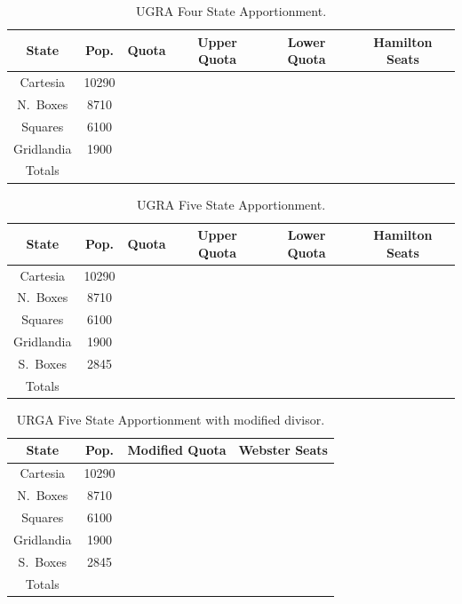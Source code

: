 	\begin{small}
		\begin{table}[!ht]
			\centering
			\renewcommand{\arraystretch}{1.5}
			\begin{tabular}{|c | c | c | c | c | c |}
				\hline
				State & Pop. & Quota & Upper Quota & Lower Quota & Hamilton Seats \\
				\hline
				Cartesia & 10290 & \phantom{Upper Quota} & & & \\
				\hline
				N.\ Boxes & 8710 & \phantom{32.26} & & & \\
				\hline
				Squares & 6100 & \phantom{22.59} & & & \\
				\hline
				Gridlandia & 1900 & \phantom{ 7.03 } & & & \\
				\hline
				Totals & & & & & \\
				\hline
			\end{tabular}
			\caption{UGRA Four State Apportionment.}
			\label{tab:four_states}
		\end{table}

		\begin{table}[!ht]
			\centering
			\renewcommand{\arraystretch}{1.5}
			\begin{tabular}{|c | c | c | c | c | c |}
				\hline
				State & Pop. & Quota & Upper Quota & Lower Quota & Hamilton Seats \\
				\hline
				Cartesia & 10290 & \phantom{Upper Quota} & & & \\
				\hline
				N.\ Boxes & 8710 & \phantom{32.26} & & & \\
				\hline
				Squares & 6100 & \phantom{22.59} & & & \\
				\hline
				Gridlandia & 1900 & \phantom{ 7.03 } & & & \\
				\hline
				S.\ Boxes & 2845 & \phantom{10.48}  & & & \\
				\hline
				Totals & & & & & \\
				\hline
			\end{tabular}
			\caption{UGRA Five State Apportionment.}
			\label{tab:five_states}
		\end{table}

		\begin{table}[!ht]
			\centering
			\renewcommand{\arraystretch}{1.5}
			\begin{tabular}{|c | c | c | c |}
				\hline
				State & Pop. & Modified Quota & Webster Seats \\
				\hline
				Cartesia & 10290 & \phantom{ 38.11 / 37.92} &\\
				\hline
				N.\ Boxes & 8710 & \phantom{32.26/32.10} & \\
				\hline
				Squares & 6100 & \phantom{22.59/22.48} &  \\
				\hline
				Gridlandia & 1900 & \phantom{ 7.03/7.00 } & \\
				\hline
				S.\ Boxes & 2845 & \phantom{10.48}  & \\
				\hline
				Totals & & & \\
				\hline
				\end{tabular}
			\caption{URGA Five State Apportionment with modified divisor.}
			\label{tab:five_states_with_modified_divisor}
		\end{table}
	\end{small}
